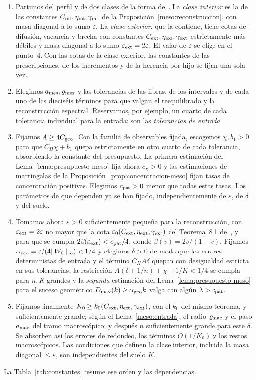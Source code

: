 \begin{enumerate}
\item Partimos del perfil y de dos clases de la forma de~\cite[Sección~8.1]{pred}. La \emph{clase
interior} es la de las constantes $C_{\rm int},\eta_{\rm int},\gamma_{\rm int}$ de la
Proposición~\ref{meso:reconstruccion}, con
masa diagonal a lo sumo $\varepsilon$. La \emph{clase exterior}, que la contiene, tiene cotas de
difusión, vacancia y brecha con constantes $C_{\rm ext},\eta_{\rm ext},\gamma_{\rm ext}$
estrictamente más débiles y masa diagonal a lo sumo $\varepsilon_{\rm ext}=2\varepsilon$. El valor de
$\varepsilon$ se elige en el punto~4. Con las
cotas de la clase exterior, las constantes de las prescripciones, de los incrementos y de la herencia
por hijo se fijan una sola vez.
\item Elegimos $a_{\rm mes},\varrho_{\rm mes}$ y las tolerancias de las fibras, de los intervalos y
de cada uno de los dieciséis términos para que valgan el reequilibrado y la reconstrucción
espectral. Reservamos, por ejemplo, un cuarto de cada tolerancia individual para la entrada: son las
\emph{tolerancias de entrada}.
\item Fijamos $A\ge4C_{\rm geo}$. Con la familia de observables fijada, escogemos $\chi,b_1>0$ para
que $C_H\chi+b_1$ quepa estrictamente en otro cuarto de cada tolerancia, absorbiendo la constante
del presupuesto. La primera estimación del Lema~\ref{lema:presupuesto-meso} fija ahora $c_\chi>0$ y
las estimaciones de martingalas de la Proposición~\ref{prop:concentracion-meso} fijan tasas de
concentración positivas. Elegimos $c_{\rm pat}>0$ menor que todas estas tasas. Los parámetros de que
dependen ya se han fijado, independientemente de $\varepsilon$, de $\delta$ y del suelo.
\item Tomamos ahora $\varepsilon>0$ suficientemente pequeña para la reconstrucción, con
$\varepsilon_{\rm ext}=2\varepsilon$ no mayor que la cota
$\varepsilon_0(C_{\rm ext},\eta_{\rm ext},\gamma_{\rm ext})$ del Teorema~8.1 de~\cite{pred}, y para
que se cumpla $2\beta(\varepsilon_{\rm ext})<c_{\rm pat}/4$, donde ${\beta(v)=2v/(1-v)}$. Fijamos
$\alpha_{\rm geo}=\varepsilon/(4\|W_0\|_\infty)<1/4$ y elegimos $\delta>0$ de modo que los errores
deterministas de entrada y el término $C_HA\delta$ quepan con desigualdad estricta en sus
tolerancias, la restricción $A(\delta+1/n)+\chi+1/K<1/4$ se cumpla para $n,K$ grandes y la
\emph{segunda} estimación del Lema~\ref{lema:presupuesto-meso} para el suceso geométrico
$D_{\max}(k)\ge\alpha_{\rm geo} k$ valga con algún $\lambda>c_{\rm pat}$.
\item Fijamos finalmente $K_0\ge k_0(C_{\rm ext},\eta_{\rm ext},\gamma_{\rm ext})$, con el $k_0$ del
mismo teorema, y suficientemente grande; según el Lema~\ref{meso:entrada}, el radio
$\varrho_{\rm mac}$ y el paso $a_{\rm mac}$ del tramo macroscópico; y después $n$ suficientemente
grande para este $\delta$. Se absorben así los errores de redondeo, los términos $O(1/K_0)$ y los
restos macroscópicos. Las condiciones que definen la clase interior, incluida la masa diagonal
$\le\varepsilon$, son independientes del suelo $K$.
\end{enumerate}
La Tabla~\ref{tab:constantes} resume ese orden y las dependencias.


